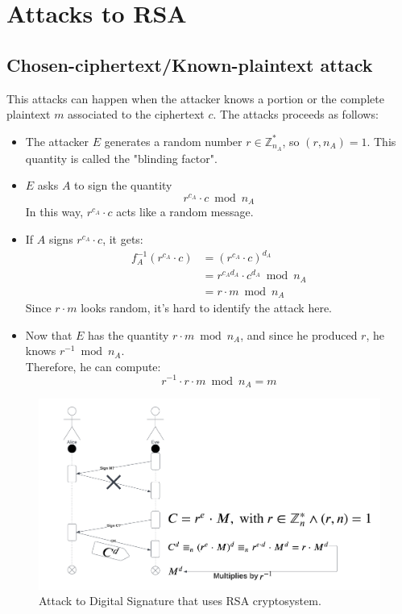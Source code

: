 \section{Attacks to RSA}
\subsection{Chosen-ciphertext/Known-plaintext attack}
This attacks can happen when the attacker knows a portion or the complete plaintext $m$ associated to the ciphertext $c$.\newline
The attacks proceeds as follows:
\begin{itemize}
    \item The attacker $E$ generates a random number $r \in \mathbb{Z}_{n_{A}}^{*}$, so $(r, n_{A}) = 1$. This quantity is called the "blinding factor".
    \item $E$ asks $A$ to sign the quantity
    \[r^{c_{A}} \cdot c \bmod n_{A}\]
    In this way, $r^{c_{A}} \cdot c$ acts like a random message.
    \item If $A$ signs $r^{c_{A}} \cdot c$, it gets:
    \begin{align*}
        f_{A}^{-1}(r^{c_{A}} \cdot c) &= (r^{c_{A}} \cdot c)^{d_{A}} \\
        &= r^{c_{A}d_{A}} \cdot c^{d_{A}} \bmod n_{A} \\
        &= r \cdot m \bmod n_{A}
    \end{align*}
    Since $r \cdot m$ looks random, it's hard to identify the attack here.
    \item Now that $E$ has the quantity $r \cdot m \bmod n_{A}$, and since he produced $r$, he knows $r^{-1} \bmod n_{A}$.\\
    Therefore, he can compute:
    \[r^{-1} \cdot r \cdot m \bmod n_{A} = m\]
\end{itemize}
\begin{figure}[h]
    \centering
    \includegraphics[width=\textwidth]{img/RSA_attack_knownp.png}
    \caption{Attack to Digital Signature that uses RSA cryptosystem.}
\end{figure}

